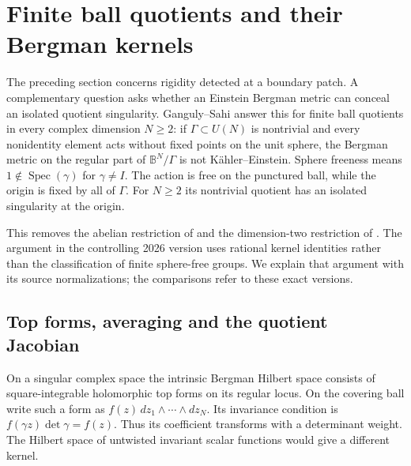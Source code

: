 \section{Finite ball quotients and their Bergman kernels}
\label{sec:appH-ball-quotients}

The preceding section concerns rigidity detected at a boundary
patch. A complementary question asks whether an Einstein Bergman
metric can conceal an isolated quotient singularity. Ganguly--Sahi
\cite[Theorem~1.3]{GangulySahi26BallQuotientsV1} answer this for
finite ball quotients in every complex dimension $N\geq2$:
if $\Gamma\subset U(N)$ is nontrivial and every nonidentity
element acts without fixed points on the unit sphere, the
Bergman metric on the regular part of $\mathbb B^N/\Gamma$
is not K\"ahler--Einstein. Sphere freeness means
$1\notin\operatorname{Spec}(\gamma)$ for $\gamma\ne I$.
The action is free on the punctured ball, while the origin
is fixed by all of $\Gamma$. For $N\geq2$ its nontrivial
quotient has an isolated singularity at the origin.

This removes the abelian restriction of
\cite[Theorem~1.4]{EbenfeltXiaoXu21BallQuotientsAdvance}
and the dimension-two restriction of
\cite[Theorem~1]{GangulySinha24SteinV3}.
The argument in the controlling 2026 version uses rational
kernel identities rather than the classification of finite
sphere-free groups. We explain that argument with its source
normalizations; the comparisons refer to these exact versions.

\subsection{Top forms, averaging and the quotient Jacobian}
\label{sec:appH-ball-quotient-kernel}

On a singular complex space the intrinsic Bergman Hilbert space
consists of square-integrable holomorphic top forms on its
regular locus. On the covering ball write such a form as
$f(z)\,dz_1\wedge\cdots\wedge dz_N$. Its invariance condition is
$f(\gamma z)\det\gamma=f(z)$. Thus its coefficient transforms
with a determinant weight. The Hilbert space of untwisted
invariant scalar functions would give a different kernel.

